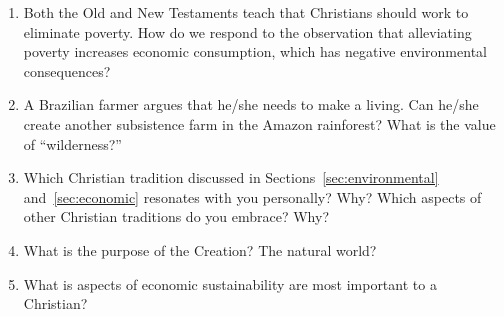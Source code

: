 \documentclass[12pt]{article}
\begin{document}
\begin{enumerate}
        
  \item Both the Old and New Testaments teach that Christians should work to eliminate poverty. 
        How do we respond to the observation that alleviating poverty increases economic consumption, 
		which has negative environmental consequences?
		
  \item A Brazilian farmer argues that he/she needs to make a living. 
        Can he/she create another subsistence farm in the Amazon rainforest?  
		What is the value of ``wilderness?''
		
  \item Which Christian tradition discussed in Sections~\ref{sec:environmental} and~\ref{sec:economic}
        resonates with you personally? Why? Which aspects of other Christian traditions do you embrace? Why?


		
  \item What is the purpose of the Creation? The natural world?

  \item What is aspects of economic sustainability are most important to a Christian?

\end{enumerate}




\printbibliography
\end{document}
